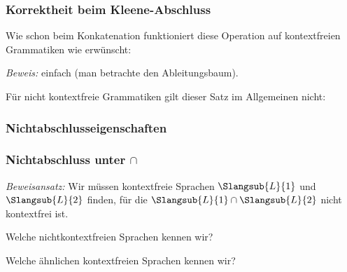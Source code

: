 \documentclass[aspectratio=1610,onlymath]{beamer}
\begin{document}
\begin{frame}\frametitle{Korrektheit beim Kleene-Abschluss}

Wie schon beim Konkatenation funktioniert diese Operation auf kontextfreien Grammatiken wie
erwünscht:


\emph{Beweis:} einfach (man betrachte den Ableitungsbaum).
\medskip\pause

Für nicht kontextfreie Grammatiken gilt dieser Satz im Allgemeinen nicht:


\end{frame}

\begin{frame}\frametitle{Nichtabschlusseigenschaften}


\end{frame}

\begin{frame}\frametitle{Nichtabschluss unter $\cap$}

\emph{Beweisansatz:} Wir müssen kontextfreie Sprachen $\Slangsub{L}{1}$ und $\Slangsub{L}{2}$ finden, für die
$\Slangsub{L}{1}\cap\Slangsub{L}{2}$ nicht kontextfrei ist.\medskip

\alert{Welche nichtkontextfreien Sprachen kennen wir?}\pause
\medskip

\bigskip\pause

\alert{Welche ähnlichen kontextfreien Sprachen kennen wir?}\pause
\medskip


\end{frame}
\end{document}
